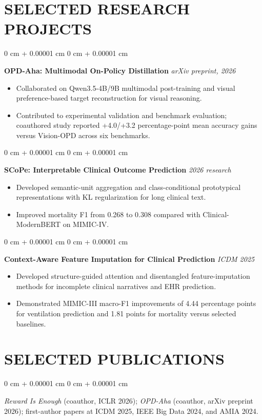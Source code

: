 \documentclass[10pt, letterpaper]{article}
\newenvironment{highlights}{
    \begin{itemize}[
        topsep=0.03 cm,
        parsep=0.02 cm,
        partopsep=0pt,
        itemsep=0pt,
        leftmargin=0 cm + 10pt
    ]
}{
    \end{itemize}
} %
\newenvironment{onecolentry}{
    \begin{adjustwidth}{
        0 cm + 0.00001 cm
    }{
        0 cm + 0.00001 cm
    }
}{
    \end{adjustwidth}
} %
\begin{document}
\section{SELECTED RESEARCH PROJECTS}
\begin{onecolentry}
\textbf{OPD-Aha: Multimodal On-Policy Distillation} \hfill \textit{arXiv preprint, 2026}
\begin{highlights}
\item Collaborated on Qwen3.5-4B/9B multimodal post-training and visual preference-based target reconstruction for visual reasoning.
\item Contributed to experimental validation and benchmark evaluation; coauthored study reported +4.0/+3.2 percentage-point mean accuracy gains versus Vision-OPD across six benchmarks.
\end{highlights}
\end{onecolentry}
\vspace{0.02 cm}
\begin{onecolentry}
\textbf{SCoPe: Interpretable Clinical Outcome Prediction} \hfill \textit{2026 research}
\begin{highlights}
\item Developed semantic-unit aggregation and class-conditional prototypical representations with KL regularization for long clinical text.
\item Improved mortality F1 from 0.268 to 0.308 compared with Clinical-ModernBERT on MIMIC-IV.
\end{highlights}
\end{onecolentry}
\vspace{0.02 cm}
\begin{onecolentry}
\textbf{Context-Aware Feature Imputation for Clinical Prediction} \hfill \textit{ICDM 2025}
\begin{highlights}
\item Developed structure-guided attention and disentangled feature-imputation methods for incomplete clinical narratives and EHR prediction.
\item Demonstrated MIMIC-III macro-F1 improvements of 4.44 percentage points for ventilation prediction and 1.81 points for mortality versus selected baselines.
\end{highlights}
\end{onecolentry}
\vspace{0.02 cm}
\section{SELECTED PUBLICATIONS}
\begin{onecolentry}
\textit{Reward Is Enough} (coauthor, ICLR 2026); \textit{OPD-Aha} (coauthor, arXiv preprint 2026); first-author papers at ICDM 2025, IEEE Big Data 2024, and AMIA 2024.
\end{onecolentry}
\end{document}

